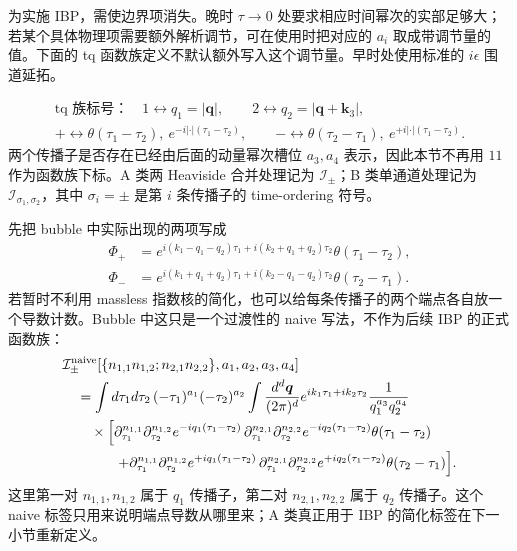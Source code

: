﻿\documentclass[a4paper,11pt]{article}
\begin{document}
为实施 IBP，需使边界项消失。晚时 $\tau\to0$ 处要求相应时间幂次的实部足够大；若某个具体物理项需要额外解析调节，可在使用时把对应的 $a_i$ 取成带调节量的值。下面的 tq 函数族定义不默认额外写入这个调节量。早时处使用标准的 $i\epsilon$ 围道延拓。

\begin{equation}
    \boxed{
    \begin{gathered}
    \text{tq 族标号：}\quad
    1\leftrightarrow q_1=|\boldsymbol{q}|,\qquad
    2\leftrightarrow q_2=|\boldsymbol{q}+\boldsymbol{k}_3|,\\
    +\leftrightarrow \theta(\tau_1-\tau_2),\ e^{-i|\cdot|(\tau_1-\tau_2)},\qquad
    -\leftrightarrow \theta(\tau_2-\tau_1),\ e^{+i|\cdot|(\tau_1-\tau_2)}.
    \end{gathered}}
\end{equation}
两个传播子是否存在已经由后面的动量幂次槽位 $a_3,a_4$ 表示，因此本节不再用 $11$ 作为函数族下标。A 类两 Heaviside 合并处理记为 $\mathcal{I}_{\pm}$；B 类单通道处理记为 $\mathcal{I}_{\sigma_1,\sigma_2}$，其中 $\sigma_i=\pm$ 是第 $i$ 条传播子的 time-ordering 符号。

先把 bubble 中实际出现的两项写成
\begin{align}
    \Phi_{+}&=e^{i(k_1-q_1-q_2)\tau_1
    +i(k_2+q_1+q_2)\tau_2}\theta(\tau_1-\tau_2),\\
    \Phi_{-}&=e^{i(k_1+q_1+q_2)\tau_1
    +i(k_2-q_1-q_2)\tau_2}\theta(\tau_2-\tau_1).
\end{align}
若暂时不利用 massless 指数核的简化，也可以给每条传播子的两个端点各自放一个导数计数。Bubble 中这只是一个过渡性的 naive 写法，不作为后续 IBP 的正式函数族：
\begin{equation}
\begin{aligned}
    &\mathcal{I}_{\pm}^{\mathrm{naive}}[\{n_{1,1}n_{1,2};n_{2,1}n_{2,2}\},a_1,a_2,a_3,a_4]\\
    &\quad=\int d\tau_1d\tau_2\,(-\tau_1)^{a_1}(-\tau_2)^{a_2}
    \int\frac{d^d\boldsymbol{q}}{(2\pi)^d}
    e^{ik_1\tau_1+ik_2\tau_2}\frac{1}{q_1^{a_3}q_2^{a_4}}\\
    &\qquad\times\Bigl[
    \partial_{\tau_1}^{n_{1,1}}\partial_{\tau_2}^{n_{1,2}}e^{-iq_1(\tau_1-\tau_2)}
    \,\partial_{\tau_1}^{n_{2,1}}\partial_{\tau_2}^{n_{2,2}}e^{-iq_2(\tau_1-\tau_2)}
    \theta(\tau_1-\tau_2)
    \Bigr.\\
    &\qquad\qquad\Bigl.
    +\partial_{\tau_1}^{n_{1,1}}\partial_{\tau_2}^{n_{1,2}}e^{+iq_1(\tau_1-\tau_2)}
    \,\partial_{\tau_1}^{n_{2,1}}\partial_{\tau_2}^{n_{2,2}}e^{+iq_2(\tau_1-\tau_2)}
    \theta(\tau_2-\tau_1)
    \Bigr].
\end{aligned}
\end{equation}
这里第一对 $n_{1,1},n_{1,2}$ 属于 $q_1$ 传播子，第二对 $n_{2,1},n_{2,2}$ 属于 $q_2$ 传播子。这个 naive 标签只用来说明端点导数从哪里来；A 类真正用于 IBP 的简化标签在下一小节重新定义。
\end{document}
